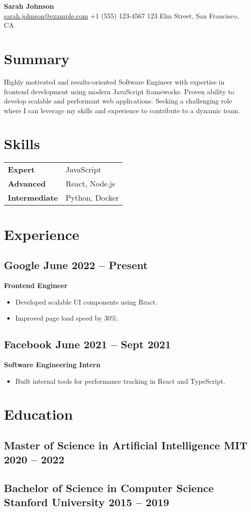 \documentclass{article}
\newcommand{\cvsection}[1]{\section*{\textbf{#1}}}
\newcommand{\cvsubsection}[1]{\subsection*{\textbf{#1}}}
\begin{document}
\begin{center}
    {\Large \textbf{Sarah Johnson}} \\
    \href{mailto:sarah.johnson@example.com}{sarah.johnson@example.com} \hspace{1cm} +1 (555) 123-4567 \hspace{1cm} 123 Elm Street, San Francisco, CA \\
    \href{https://linkedin.com/in/sarahjohnson}{\faLinkedin} \hspace{1cm} \href{https://github.com/sjohnson-dev}{\faGithub} \hspace{1cm} \href{https://sarahjohnson.dev}{\faGlobe}
\end{center}

\cvsection{Summary}
Highly motivated and results-oriented Software Engineer with expertise in frontend development using modern JavaScript frameworks. Proven ability to develop scalable and performant web applications.  Seeking a challenging role where I can leverage my skills and experience to contribute to a dynamic team.

\cvsection{Skills}
\begin{tabularx}{\textwidth}{lX}
    \textbf{Expert} & JavaScript \\
    \textbf{Advanced} & React, Node.js \\
    \textbf{Intermediate} & Python, Docker \\
\end{tabularx}

\cvsection{Experience}
\cvsubsection{Google \hfill June 2022 -- Present}
\textbf{Frontend Engineer} \\
\begin{itemize}
    \item Developed scalable UI components using React.
    \item Improved page load speed by 30\%.
\end{itemize}

\cvsubsection{Facebook \hfill June 2021 -- Sept 2021}
\textbf{Software Engineering Intern} \\
\begin{itemize}
    \item Built internal tools for performance tracking in React and TypeScript.
\end{itemize}


\cvsection{Education}
\cvsubsection{Master of Science in Artificial Intelligence \hfill MIT \hfill 2020 -- 2022}
\cvsubsection{Bachelor of Science in Computer Science \hfill Stanford University \hfill 2015 -- 2019}
\end{document}
